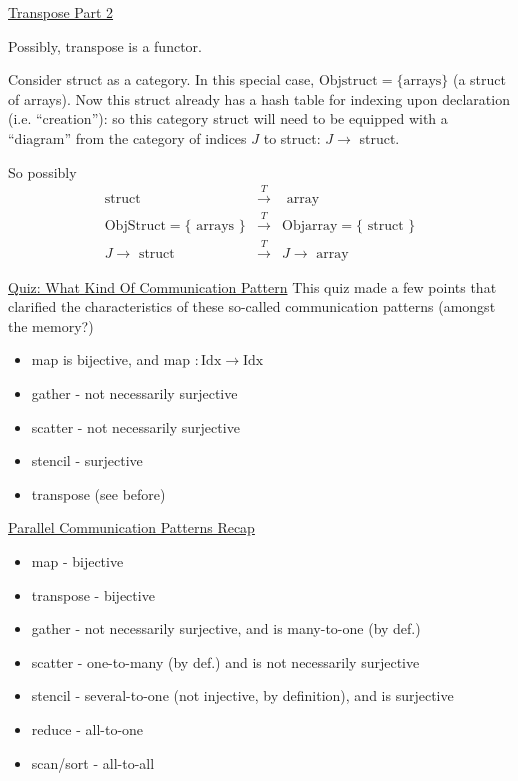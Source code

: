 \documentclass[10pt]{amsart}
\begin{document}
\begin{multicols*}{2}
\href{https://classroom.udacity.com/courses/cs344/lessons/77202674/concepts/773153710923}{Transpose Part 2}

Possibly, transpose is a functor.

Consider struct as a category.  In this special case, $\text{Obj}\text{struct} = \lbrace \text{arrays} \rbrace$ (a struct of arrays).  Now this struct already has a hash table for indexing upon declaration (i.e. ``creation''): so this category struct will need to be equipped with a ``diagram'' from the category of indices $J$ to struct: $J\to $ struct.

So possibly
\[
\begin{aligned}
  \text{struct} & \xrightarrow{T} & \text{ array } \\ 
 \text{Obj}\text{Struct} = \lbrace \text{ arrays } \rbrace & \xrightarrow{T} & \text{Obj}\text{array} = \lbrace \text{ struct } \rbrace \\ 
 J\to \text{ struct } & \xrightarrow{T} & J \to \text{ array } 
  \end{aligned}
\]







\href{https://classroom.udacity.com/courses/cs344/lessons/77202674/concepts/787012800923}{Quiz: What Kind Of Communication Pattern}
This quiz made a few points that clarified the characteristics of these so-called communication patterns (amongst the memory?)

\begin{itemize}
  \item map is bijective, and map $:\text{Idx} \to \text{Idx}$
  \item gather - not necessarily surjective
  \item scatter - not necessarily surjective 
  \item stencil - surjective
  \item transpose (see before)
  \end{itemize}




\href{https://classroom.udacity.com/courses/cs344/lessons/77202674/concepts/773153720923}{Parallel Communication Patterns Recap}

\begin{itemize}
\item map - bijective
\item transpose - bijective
\item gather - not necessarily surjective, and is many-to-one (by def.)
\item scatter - one-to-many (by def.) and is not necessarily surjective
\item stencil - several-to-one (not injective, by definition), and is surjective
\item reduce - all-to-one
  \item scan/sort - all-to-all
\end{itemize}


\end{multicols*}
\end{document}
